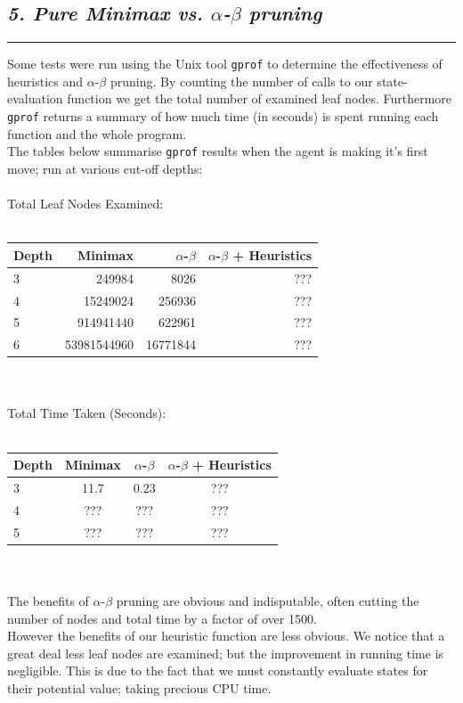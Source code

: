 \documentclass[10pt]{article}
\begin{document}
\begin{multicols}{2}
\subsection*{\emph { \textmd{5. Pure Minimax vs. $\alpha$-$\beta$ pruning}}}
\hrule
\vspace{0.4cm}
Some tests were run using the Unix tool \texttt{gprof} to determine the effectiveness
of heuristics and $\alpha$-$\beta$ pruning. By counting the number of calls
to our state-evaluation function we get the total number of examined leaf nodes.
Furthermore \texttt{gprof} returns a summary of how much time (in seconds) is spent running
each function and the whole program.\\
The tables below summarise \texttt{gprof} results when the agent is making it's first move;
run at various cut-off depths:\\\\
Total Leaf Nodes Examined:\\\\
\begin{tabular}{ | l | r r r | }
  \hline                        
  Depth & Minimax & $\alpha$-$\beta$ & $\alpha$-$\beta$ + Heuristics \\ \hline
  3 & 249984 & 8026 & ??? \\
  4 & 15249024 & 256936 & ??? \\
  5 & 914941440 & 622961 & ??? \\
  6 & 53981544960 & 16771844 & ??? \\
  \hline  
\end{tabular}\\\\
Total Time Taken (Seconds):\\\\
\begin{tabular}{ | l | c c c | }
  \hline                        
  Depth & Minimax & $\alpha$-$\beta$ & $\alpha$-$\beta$ + Heuristics \\ \hline
  3 & 11.7 & 0.23 & ??? \\
  4 & ??? & ??? & ??? \\
  5 & ??? & ??? & ??? \\
  \hline  
\end{tabular}\\\\
The benefits of $\alpha$-$\beta$ pruning are obvious and indisputable, often cutting
the number of nodes and total time by a factor of over 1500.\\
However the benefits of our heuristic function are less obvious. We notice that
a great deal less leaf nodes are examined; but the improvement in running time is
negligible. This is due to the fact that we must constantly evaluate states for their
potential value; taking precious CPU time.


\end{multicols}
\end{document}
